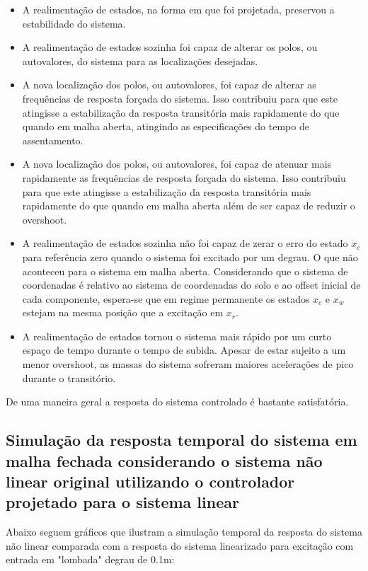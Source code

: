 \documentclass[a4paper]{ifacconf}
\begin{document}
    \begin{itemize}
        \item A realimentação de estados, na forma em que foi projetada, preservou a estabilidade do sistema.
        \item A realimentação de estados sozinha foi capaz de alterar os polos, ou autovalores, do sistema para as localizações desejadas.
        \item A nova localização dos polos, ou autovalores, foi capaz de alterar as frequências de resposta forçada do sistema. Isso contribuiu para que este atingisse a estabilização da resposta transitória mais rapidamente do que quando em malha aberta, atingindo as especificações do tempo de assentamento.
        \item A nova localização dos polos, ou autovalores, foi capaz de atenuar mais rapidamente as frequências de resposta forçada do sistema. Isso contribuiu para que este atingisse a estabilização da resposta transitória mais rapidamente do que quando em malha aberta além de ser capaz de reduzir o overshoot.
        \item A realimentação de estados sozinha não foi capaz de zerar o erro do estado $\dot{x}_c$ para referência zero quando o sistema foi excitado por um degrau. O que não aconteceu para o sistema em malha aberta. Considerando que o sistema de coordenadas é relativo ao sistema de coordenadas do solo e ao offset inicial de cada componente, espera-se que em regime permanente os estados $x_c$ e $x_w$ estejam na mesma posição que a excitação em $x_r$.
        \item A realimentação de estados tornou o sistema mais rápido por um curto espaço de tempo durante o tempo de subida. Apesar de estar sujeito a um menor overshoot, as massas do sistema sofreram maiores acelerações de pico durante o transitório.
    \end{itemize}
    
    De uma maneira geral a resposta do sistema controlado é bastante satisfatória.
    
    \subsection{Simulação da resposta temporal do sistema em malha fechada considerando o sistema não linear original utilizando o controlador projetado para o sistema linear}
    
    Abaixo seguem gráficos que ilustram a simulação temporal da resposta do sistema não linear comparada com a resposta do sistema linearizado para excitação com entrada em "lombada" degrau de 0.1m:
    
\end{document}
